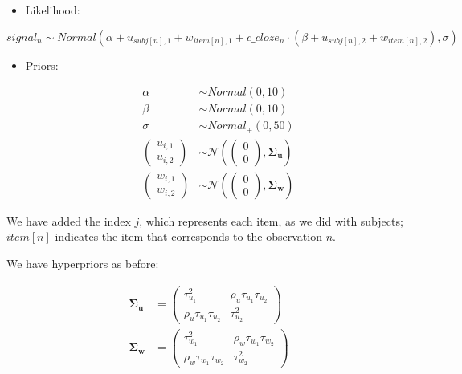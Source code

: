 \documentclass[12pt,]{krantz}
\providecommand{\tightlist}{%
  \setlength{\itemsep}{0pt}\setlength{\parskip}{0pt}}
\theoremstyle{definition}
\theoremstyle{definition}
\theoremstyle{definition}
\theoremstyle{remark}
\begin{document}
\begin{itemize}
\tightlist
\item
  Likelihood:
\end{itemize}

\begin{equation}
  signal_n \sim Normal(\alpha + u_{subj[n],1} + w_{item[n],1} + c\_cloze_n \cdot  (\beta + u_{subj[n],2}+ w_{item[n],2}), \sigma)
  \end{equation}

\begin{itemize}
\tightlist
\item
  Priors:

  \begin{equation}
   \begin{aligned}
     \alpha & \sim Normal(0,10) \\
     \beta  & \sim Normal(0,10) \\
  \sigma  &\sim Normal_+(0,50)\\
  {\begin{pmatrix}
  u_{i,1} \\
  u_{i,2}
  \end{pmatrix}}
     &\sim {\mathcal {N}}
  \left(
     {\begin{pmatrix} 
  0\\
  0
     \end{pmatrix}}
   ,\boldsymbol{\Sigma_u} \right) \\
   {\begin{pmatrix}
  w_{i,1} \\
  w_{i,2}
  \end{pmatrix}}
     &\sim {\mathcal {N}}
  \left(
     {\begin{pmatrix} 
  0\\
  0
     \end{pmatrix}}
   ,\boldsymbol{\Sigma_w} \right) 
   \end{aligned}
   \end{equation}
\end{itemize}

We have added the index \(j\), which represents each item, as we did
with subjects; \(item[n]\) indicates the item that corresponds to the
observation \(n\).

We have hyperpriors as before:

\begin{equation}
\begin{aligned}
 \boldsymbol{\Sigma_u} & = 
{\begin{pmatrix} 
\tau_{u_1}^2 & \rho_u \tau_{u_1} \tau_{u_2} \\ 
\rho_u \tau_{u_1} \tau_{u_2} & \tau_{u_2}^2
\end{pmatrix}}\\
 \boldsymbol{\Sigma_w} & = 
{\begin{pmatrix} 
\tau_{w_1}^2 & \rho_w \tau_{w_1} \tau_{w_2} \\ 
\rho_w \tau_{w_1} \tau_{w_2} & \tau_{w_2}^2
\end{pmatrix}}
 \end{aligned}
\end{equation}
\end{document}
